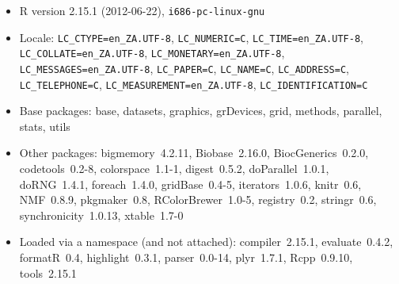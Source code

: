 \documentclass[a4paper]{article}\usepackage{graphicx, color}
\begin{document}
\begin{itemize}\raggedright
  \item R version 2.15.1 (2012-06-22), \verb|i686-pc-linux-gnu|
  \item Locale: \verb|LC_CTYPE=en_ZA.UTF-8|, \verb|LC_NUMERIC=C|, \verb|LC_TIME=en_ZA.UTF-8|, \verb|LC_COLLATE=en_ZA.UTF-8|, \verb|LC_MONETARY=en_ZA.UTF-8|, \verb|LC_MESSAGES=en_ZA.UTF-8|, \verb|LC_PAPER=C|, \verb|LC_NAME=C|, \verb|LC_ADDRESS=C|, \verb|LC_TELEPHONE=C|, \verb|LC_MEASUREMENT=en_ZA.UTF-8|, \verb|LC_IDENTIFICATION=C|
  \item Base packages: base, datasets, graphics,
    grDevices, grid, methods, parallel, stats, utils
  \item Other packages: bigmemory~4.2.11,
    Biobase~2.16.0, BiocGenerics~0.2.0,
    codetools~0.2-8, colorspace~1.1-1, digest~0.5.2,
    doParallel~1.0.1, doRNG~1.4.1, foreach~1.4.0,
    gridBase~0.4-5, iterators~1.0.6, knitr~0.6,
    NMF~0.8.9, pkgmaker~0.8, RColorBrewer~1.0-5,
    registry~0.2, stringr~0.6, synchronicity~1.0.13,
    xtable~1.7-0
  \item Loaded via a namespace (and not attached):
    compiler~2.15.1, evaluate~0.4.2, formatR~0.4,
    highlight~0.3.1, parser~0.0-14, plyr~1.7.1,
    Rcpp~0.9.10, tools~2.15.1
\end{itemize}




\printbibliography[heading=bibintoc]
\end{document}
